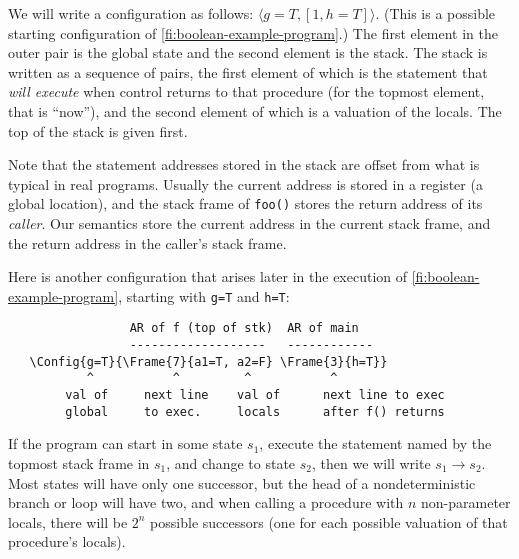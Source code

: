 \documentclass{article}
\newcommand{\Code}[1]{\texttt{#1}}
\newcommand{\Config}[2]{\ensuremath{\langle #1, #2 \rangle}}
\newcommand{\Frame}[2]{[#1, #2]}
\begin{document}
We will write a configuration as follows:
\Config{g=T}{\Frame{1}{h=T}}. (This is a possible starting
configuration of \cref{fi:boolean-example-program}.) The first element in
the outer pair is the global state and the second element is the
stack. The stack is written as a sequence of pairs, the first element
of which is the statement that \emph{will execute} when control
returns to that procedure (for the topmost element, that is ``now''),
and the second element of which is a valuation of the locals. The top
of the stack is given first.

Note that the statement addresses stored in the stack are offset from
what is typical in real programs. Usually the current address is
stored in a register (a global location), and the stack frame of
\Code{foo()} stores the return address of its \emph{caller}. Our
semantics store the current address in the current stack frame, and
the return address in the caller's stack frame\footnotemark.




Here is another configuration that arises later in the execution of
\cref{fi:boolean-example-program}, starting with \Code{g=T} and
\Code{h=T}:

\begin{minipage}{\textwidth}
\begin{verbatim}
                 AR of f (top of stk)  AR of main
                 -------------------   ------------
   \Config{g=T}{\Frame{7}{a1=T, a2=F} \Frame{3}{h=T}}
           ^           ^         ^           ^
        val of     next line    val of      next line to exec
        global     to exec.     locals      after f() returns
\end{verbatim}
\end{minipage}

If the program can start in some state $s_1$, execute the statement
named by the topmost stack frame in $s_1$, and change to state $s_2$,
then we will write $s_1 \rightarrow s_2$. Most states will have only
one successor, but the head of a nondeterministic branch or loop will
have two, and when calling a procedure with $n$ non-parameter locals,
there will be $2^n$ possible successors (one for each possible
valuation of that procedure's locals).
\end{document}
